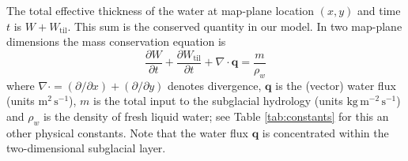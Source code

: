 \documentclass[gmd]{copernicus}   %
\newcommand{\text}{\textrm}
\newcommand\bq{\mathbf{q}}
\newcommand{\Div}{\nabla\cdot}
\newcommand{\Wtil}{W_{\text{til}}}
\begin{document}
The total effective thickness of the water at map-plane location $(x,y)$ and time $t$ is $W + \Wtil$.  This sum is the conserved quantity in our model.  In two map-plane dimensions the mass conservation equation is \citep[compare][]{Clarke05}
\begin{equation} \label{eq:conserve}
\frac{\partial W}{\partial t} + \frac{\partial \Wtil}{\partial t} + \Div \bq = \frac{m}{\rho_w}
\end{equation}
where $\Div = (\partial/\partial x) + (\partial/\partial y)$ denotes divergence, $\bq$ is the (vector) water flux (units $\text{m}^2\,\text{s}^{-1}$), $m$ is the total input to the subglacial hydrology (units $\text{kg}\,\text{m}^{-2}\,\text{s}^{-1}$) and $\rho_w$ is the density of fresh liquid water; see Table \ref{tab:constants} for this an other physical constants.  Note that the water flux $\bq$ is concentrated within the two-dimensional subglacial layer.
\end{document}
